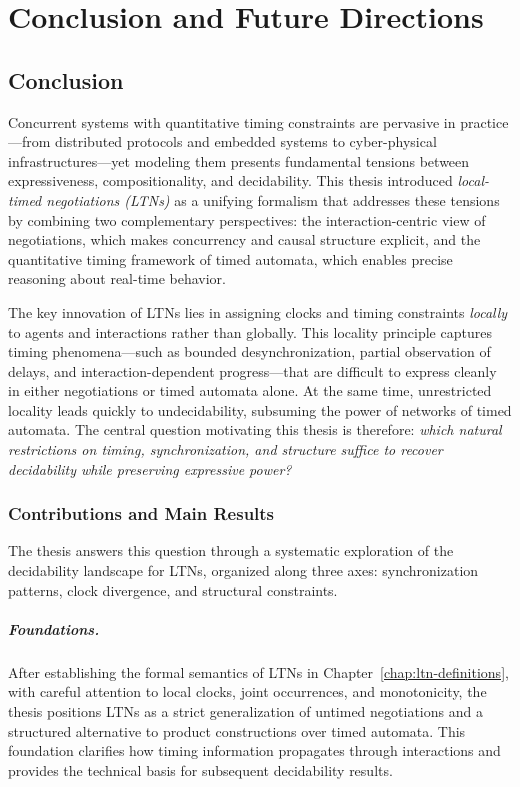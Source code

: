 \chapter{Conclusion and Future Directions}
\label{chap:conclusion}

\section{Conclusion}

Concurrent systems with quantitative timing constraints are pervasive in practice—from distributed protocols and embedded systems to cyber-physical infrastructures—yet modeling them presents fundamental tensions between expressiveness, compositionality, and decidability. This thesis introduced \emph{local-timed negotiations (LTNs)} as a unifying formalism that addresses these tensions by combining two complementary perspectives: the interaction-centric view of negotiations, which makes concurrency and causal structure explicit, and the quantitative timing framework of timed automata, which enables precise reasoning about real-time behavior.

The key innovation of LTNs lies in assigning clocks and timing constraints \emph{locally} to agents and interactions rather than globally. This locality principle captures timing phenomena—such as bounded desynchronization, partial observation of delays, and interaction-dependent progress—that are difficult to express cleanly in either negotiations or timed automata alone. At the same time, unrestricted locality leads quickly to undecidability, subsuming the power of networks of timed automata. The central question motivating this thesis is therefore: \emph{which natural restrictions on timing, synchronization, and structure suffice to recover decidability while preserving expressive power?}

\subsection*{Contributions and Main Results}

The thesis answers this question through a systematic exploration of the decidability landscape for LTNs, organized along three axes: synchronization patterns, clock divergence, and structural constraints.

\paragraph{Foundations.} After establishing the formal semantics of LTNs in Chapter~\ref{chap:ltn-definitions}, with careful attention to local clocks, joint occurrences, and monotonicity, the thesis positions LTNs as a strict generalization of untimed negotiations and a structured alternative to product constructions over timed automata. This foundation clarifies how timing information propagates through interactions and provides the technical basis for subsequent decidability results.

